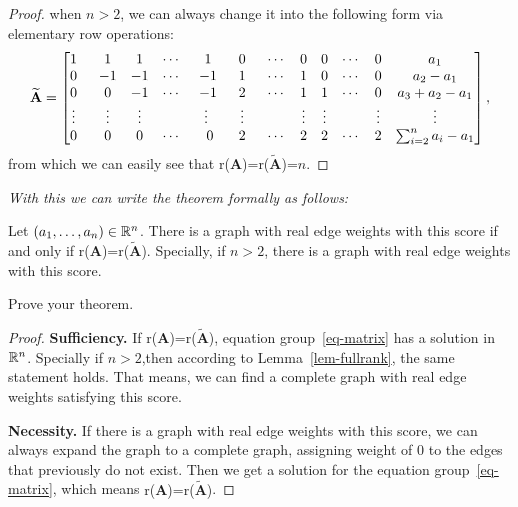 \documentclass[12pt,a4]{article}
\begin{document}
\begin{exercise}
\begin{proof}
  when $n>2$, we can always change it into the following form via elementary row operations:
  \begin{align*}
    \setcounter{MaxMatrixCols}{14}
    \mathbf{\widetilde{A}}=
    \begin{matrix}
      \begin{bmatrix}
        1&\;\;1&1&\cdots&\;1&\;\;0&\;\;\cdots&0&0&\cdots&0&a_1\\
        0&\;\;-1&-1&\cdots&\;-1&\;\;1&\;\;\cdots&1&0&\cdots&0&a_2-a_1\\
        0&\;\;0&-1&\cdots&\;-1&\;\;2&\;\;\cdots&1&1&\cdots&0&a_3+a_2-a_1\\
        \vdots&\;\;\vdots&\vdots&&\vdots&\;\;\vdots&&\vdots&\vdots&&\vdots&\vdots\\
        0&\;\;0&0&\cdots&\;\;0&\;\;2&\;\;\cdots&2&2&\cdots&2&\sum_{i=2}^na_i-a_1
      \end{bmatrix},
    \end{matrix}
  \end{align*}
  from which we can easily see that \textnormal{r($\mathbf{A}$)=r($\mathbf{\widetilde{A}}$)}=$n$.
\end{proof}
\emph{With this we can write the theorem formally as follows:}
  \begin{theorem}
     Let $(a_1,\dots,a_n) \in \mathbb{R}^n$. There is a  graph with real edge weights
     with this score if and only if \textnormal{r($\mathbf{A}$)=r($\mathbf{\widetilde{A}}$)}. Specially, if $n>2$, there is a graph with real edge weights with this score.
  \end{theorem}  
\end{exercise}

\begin{exercise}
Prove your theorem.
\begin{proof}
  \textbf{Sufficiency.} If \textnormal{r($\mathbf{A}$)=r($\mathbf{\widetilde{A}}$)},  equation group~\eqref{eq-matrix} has a solution in $\mathbb{R}^n$. Specially if $n>2$,then according to Lemma~\ref{lem-fullrank}, the same statement holds. That means, we can find a complete graph with real edge weights satisfying this score.

  \textbf{Necessity.} If there is a  graph with real edge weights with this score, we can always expand the graph to a complete graph, assigning weight of 0 to the edges that previously do not exist. Then we get a solution for the equation group~\eqref{eq-matrix}, which means \textnormal{r($\mathbf{A}$)=r($\mathbf{\widetilde{A}}$)}.
\end{proof}
\end{exercise}
\end{document}
